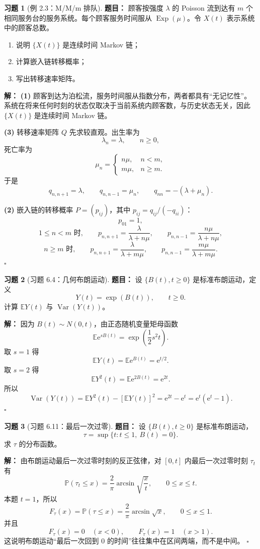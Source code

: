 \documentclass[12pt,a4paper,openany]{ctexrep}
\theoremstyle{definition}
\newtheorem{exercise}{习题}[section]
\newenvironment{solution}{\par\noindent\textbf{解：}}{\hfill$\square$\par}
\newcommand{\E}{\mathbb{E}}
\newcommand{\Var}{\operatorname{Var}}
\newcommand{\Pp}{\mathbb{P}}
\newcommand{\Exp}{\operatorname{Exp}}
\newcommand{\e}{\mathrm{e}}
\begin{document}
\begin{exercise}[例 2.3：M/M/m 排队]
\textbf{题目：}
顾客按强度 $\lambda$ 的 Poisson 流到达有 $m$ 个相同服务台的服务系统。每个顾客服务时间服从 $\Exp(\mu)$。令 $X(t)$ 表示系统中的顾客总数。
\begin{enumerate}[label=(\arabic*)]
	\item 说明 $\{X(t)\}$ 是连续时间 Markov 链；
	\item 计算嵌入链转移概率；
	\item 写出转移速率矩阵。
\end{enumerate}
\end{exercise}
\begin{solution}
\textbf{(1)} 顾客到达为泊松流，服务时间服从指数分布，两者都具有“无记忆性”。系统在将来任何时刻的状态仅取决于当前系统内顾客数，与历史状态无关，因此 $\{X(t)\}$ 是连续时间 Markov 链。

\textbf{(3)} 转移速率矩阵 $Q$ 先求较直观。出生率为
\[
\lambda_n=\lambda,\qquad n\ge0,
\]
死亡率为
\[
\mu_n=
\begin{cases}
n\mu,&n<m,\\
m\mu,&n\ge m.
\end{cases}
\]
于是
\[
q_{n,n+1}=\lambda,\qquad
q_{n,n-1}=\mu_n,\qquad
q_{nn}=-(\lambda+\mu_n).
\]

\textbf{(2)} 嵌入链的转移概率 $P=(p_{ij})$，其中 $p_{ij}=q_{ij}/(-q_{ii})$：
\[
p_{01}=1,
\]
\[
1\le n<m\text{ 时},\qquad
p_{n,n+1}=\frac{\lambda}{\lambda+n\mu},\qquad
p_{n,n-1}=\frac{n\mu}{\lambda+n\mu},
\]
\[
n\ge m\text{ 时},\qquad
p_{n,n+1}=\frac{\lambda}{\lambda+m\mu},\qquad
p_{n,n-1}=\frac{m\mu}{\lambda+m\mu}.
\]
\end{solution}

\begin{exercise}[习题 6.4：几何布朗运动]
\textbf{题目：}
设 $\{B(t),t\ge0\}$ 是标准布朗运动，定义
\[
Y(t)=\exp(B(t)),\qquad t\ge0.
\]
计算 $\E Y(t)$ 与 $\Var(Y(t))$。
\end{exercise}
\begin{solution}
因为 $B(t)\sim N(0,t)$，由正态随机变量矩母函数
\[
\E \e^{sB(t)}=\exp\left(\frac12s^2t\right).
\]
取 $s=1$ 得
\[
\E Y(t)=\E \e^{B(t)}=\e^{t/2}.
\]
取 $s=2$ 得
\[
\E Y^2(t)=\E \e^{2B(t)}=\e^{2t}.
\]
所以
\[
\Var(Y(t))=\E Y^2(t)-[\E Y(t)]^2
=\e^{2t}-\e^t=\e^t(\e^t-1).
\]
\end{solution}

\begin{exercise}[习题 6.11：最后一次过零]
\textbf{题目：}
设 $\{B(t),t\ge0\}$ 是标准布朗运动，
\[
\tau=\sup\{t:t\le1,\ B(t)=0\}.
\]
求 $\tau$ 的分布函数。
\end{exercise}
\begin{solution}
由布朗运动最后一次过零时刻的反正弦律，对 $[0,t]$ 内最后一次过零时刻 $\tau_t$ 有
\[
\Pp(\tau_t\le x)=\frac2\pi\arcsin\sqrt{\frac{x}{t}},
\qquad 0\le x\le t.
\]
本题 $t=1$，所以
\[
F_\tau(x)=\Pp(\tau\le x)=\frac2\pi\arcsin\sqrt{x},
\qquad 0\le x\le1.
\]
并且
\[
F_\tau(x)=0\quad (x<0),\qquad F_\tau(x)=1\quad (x>1).
\]
这说明布朗运动“最后一次回到 $0$ 的时间”往往集中在区间两端，而不是中间。
\end{solution}
\end{document}
